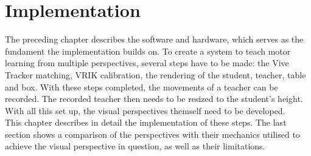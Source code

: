 \chapter{Implementation}
The preceding chapter describes the software and hardware, which serves as the fundament the implementation builds on. To create a system to teach motor learning from multiple perspectives, several steps have to be made: the Vive Tracker matching, VRIK calibration, the rendering of the student, teacher, table and box. With these steps completed, the movements of a teacher can be recorded. The recorded teacher then needs to be resized to the student's height. With all this set up, the visual perspectives themself need to be developed.\\
This chapter describes in detail the implementation of these steps. The last section shows a comparison of the perspectives with their mechanics utilised to achieve the visual perspective in question, as well as their limitations.

